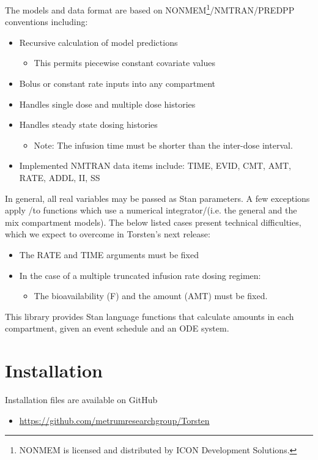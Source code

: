 \documentclass[11pt, reqno]{amsbook}
\numberwithin{section}{chapter}
\theoremstyle{remark}
\begin{document}
The models and data format are based on
NONMEM\textregistered{}\footnote{NONMEM\textregistered{} is licensed and distributed by ICON Development Solutions.}/NMTRAN/PREDPP
conventions including:
\begin{itemize}
\item Recursive calculation of model predictions
\begin{itemize}
\item This permits piecewise constant covariate values
\end{itemize}
\item Bolus or constant rate inputs into any compartment
\item Handles single dose and multiple dose histories
\item Handles steady state dosing histories
\begin{itemize}
\item Note: The infusion time must be shorter than the inter-dose interval.
\end{itemize}
\item Implemented NMTRAN data items include: TIME, EVID, CMT, AMT, RATE, ADDL, II, SS
\end{itemize}

In general, all real variables may be passed as Stan parameters. A
few exceptions apply /to functions which use a numerical
integrator/(i.e. the general and the mix compartment
models). The below listed cases present technical difficulties, which we expect to
overcome in Torsten's next release:
\begin{itemize}
\item The RATE and TIME arguments must be fixed
\item In the case of a multiple truncated infusion rate dosing regimen:
\begin{itemize}
\item The bioavailability (F) and the amount (AMT) must be fixed.
\end{itemize}
\end{itemize}

This library provides Stan language functions that calculate amounts
in each compartment, given an event schedule and an ODE system.

\section{Installation}
\label{sec:orgeb4078b}
Installation files are available on GitHub

\begin{itemize}
\item \url{https://github.com/metrumresearchgroup/Torsten}
\end{itemize}
\end{document}
